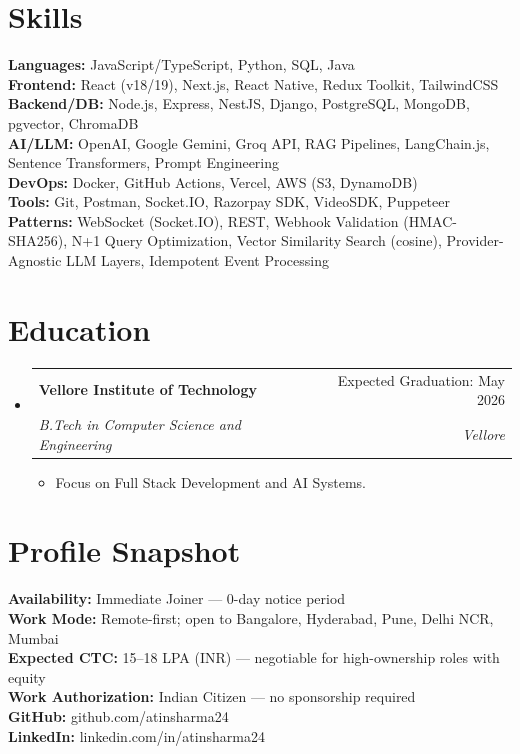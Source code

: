 \documentclass[a4paper,10pt]{article}
\makeatletter
\newcommand{\resumeItem}[1]{
  \item\small{{#1 \vspace{-2pt}}}
}
\newcommand{\resumeSubheading}[4]{
  \vspace{-2pt}\item
    \begin{tabular*}{\textwidth}{l@{\extracolsep{\fill}}r}
      \textbf{#1} & #2 \\
      \textit{\small#3} & \textit{\small #4} \\
    \end{tabular*}\vspace{-7pt}
}
\newcommand{\resumeSubHeadingListStart}{\begin{itemize}[leftmargin=0.15in, label={}]}
\newcommand{\resumeSubHeadingListEnd}{\end{itemize}}
\newcommand{\resumeItemListStart}{\begin{itemize}}
\newcommand{\resumeItemListEnd}{\end{itemize}\vspace{-5pt}}
\makeatother
\begin{document}
\section{Skills}
 \begin{itemize}[leftmargin=0.15in, label={}]
    \small{\item{
     \textbf{Languages:}{ JavaScript/TypeScript, Python, SQL, Java} \\
     \textbf{Frontend:}{ React (v18/19), Next.js, React Native, Redux Toolkit, TailwindCSS} \\
     \textbf{Backend/DB:}{ Node.js, Express, NestJS, Django, PostgreSQL, MongoDB, pgvector, ChromaDB} \\
     \textbf{AI/LLM:}{ OpenAI, Google Gemini, Groq API, RAG Pipelines, LangChain.js, Sentence Transformers, Prompt Engineering} \\
     \textbf{DevOps:}{ Docker, GitHub Actions, Vercel, AWS (S3, DynamoDB)} \\
     \textbf{Tools:}{ Git, Postman, Socket.IO, Razorpay SDK, VideoSDK, Puppeteer} \\
     \textbf{Patterns:}{ WebSocket (Socket.IO), REST, Webhook Validation (HMAC-SHA256), N+1 Query Optimization, Vector Similarity Search (cosine), Provider-Agnostic LLM Layers, Idempotent Event Processing}
    }}
 \end{itemize}

\section{Education}
  \resumeSubHeadingListStart
    \resumeSubheading
      {Vellore Institute of Technology}{Expected Graduation: May 2026}
      {B.Tech in Computer Science and Engineering}{Vellore}
      \resumeItemListStart
        \resumeItem{Focus on Full Stack Development and AI Systems.}
      \resumeItemListEnd
  \resumeSubHeadingListEnd

\section{Profile Snapshot}
\begin{itemize}[leftmargin=0.15in, label={}]
  \small{\item{
    \textbf{Availability:}{ Immediate Joiner --- 0-day notice period} \\
    \textbf{Work Mode:}{ Remote-first; open to Bangalore, Hyderabad, Pune, Delhi NCR, Mumbai} \\
    \textbf{Expected CTC:}{ 15--18 LPA (INR) --- negotiable for high-ownership roles with equity} \\
    \textbf{Work Authorization:}{ Indian Citizen --- no sponsorship required} \\
    \textbf{GitHub:}{ github.com/atinsharma24} \\
    \textbf{LinkedIn:}{ linkedin.com/in/atinsharma24}
  }}
\end{itemize}
\end{document}
